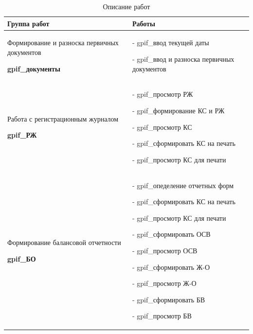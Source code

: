 \begin{table}[h!p]
    \centering
    \scriptsize
    \caption{Описание работ}
    \begin{tabular}{|p{8cm}|p{8cm}|} 


\hline


\textbf{Группа работ}
&
\textbf{Работы}
\\ \hline


Формирование и разноска первичных документов \par
\hspace{0pt} \par
\textbf{gpif\_документы}
&
- gpif\_ввод текущей даты \par
- gpif\_ввод и разноска первичных документов
\\ \hline


Работа с регистрационным журналом \par
\hspace{0pt} \par
\textbf{gpif\_РЖ}
&
- gpif\_просмотр РЖ \par
- gpif\_формирование КС и РЖ \par
- gpif\_просмотр КС \par
- gpif\_сформировать КС на печать \par
- gpif\_просмотр КС для печати
\\ \hline


Формирование балансовой отчетности \par
\hspace{0pt} \par
\textbf{gpif\_БО}
&
- gpif\_опеделение отчетных форм \par
- gpif\_сформировать КС на печать \par
- gpif\_просмотр КС для печати \par
- gpif\_сформировать ОСВ \par
- gpif\_просмотр ОСВ \par
- gpif\_сформировать Ж-О \par
- gpif\_просмотр Ж-О \par
- gpif\_сформировать БВ \par
- gpif\_просмотр БВ
\\ \hline


\end{tabular}
\end{table}
